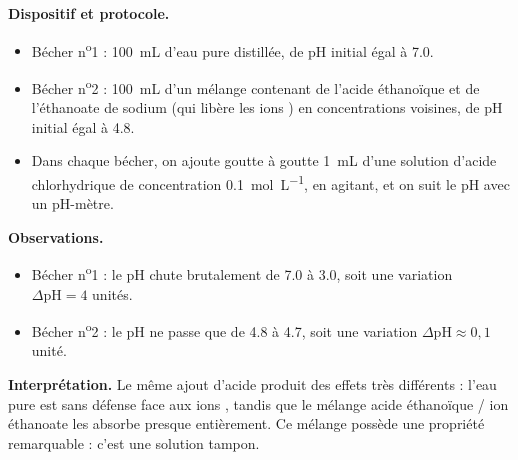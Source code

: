 \documentclass[11pt]{article}
\begin{document}
\begin{experience}
\textbf{Dispositif et protocole.}
\begin{itemize}
\item Bécher n\textsuperscript{o}1 : \SI{100}{mL} d'eau pure distillée, de pH initial égal à \num{7,0}.
\item Bécher n\textsuperscript{o}2 : \SI{100}{mL} d'un mélange contenant de l'acide éthanoïque  et de l'éthanoate de sodium  (qui libère les ions ) en concentrations voisines, de pH initial égal à \num{4,8}.
\item Dans chaque bécher, on ajoute goutte à goutte \SI{1}{mL} d'une solution d'acide chlorhydrique de concentration \SI{0,1}{mol.L^{-1}}, en agitant, et on suit le pH avec un pH-mètre.
\end{itemize}
\textbf{Observations.}
\begin{itemize}
\item Bécher n\textsuperscript{o}1 : le pH chute brutalement de \num{7,0} à \num{3,0}, soit une variation $\Delta\text{pH} = 4$ unités.
\item Bécher n\textsuperscript{o}2 : le pH ne passe que de \num{4,8} à \num{4,7}, soit une variation $\Delta\text{pH} \approx 0,1$ unité.
\end{itemize}
\textbf{Interprétation.} Le même ajout d'acide produit des effets très différents : l'eau pure est sans défense face aux ions , tandis que le mélange acide éthanoïque / ion éthanoate les \og absorbe \fg{} presque entièrement. Ce mélange possède une propriété remarquable : c'est une solution tampon.
\end{experience}
\end{document}

